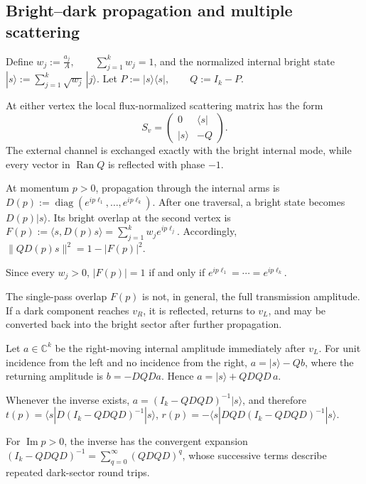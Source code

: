 \documentclass[11pt]{article}
\theoremstyle{plain}
\theoremstyle{definition}
\begin{document}
\subsection{Bright--dark propagation and multiple scattering}
\label{subsec:split-rejoin-bright-dark}
\label{subsec:split-rejoin-propagation}
\label{subsec:split-rejoin-multiple-scattering}

Define
\(w_j:=\frac{a_j}{A}, \qquad \sum_{j=1}^{k}w_j=1\),
and the normalized internal bright state
\(|s\rangle := \sum_{j=1}^{k}\sqrt{w_j}\,|j\rangle\).
Let
\(P:=|s\rangle\langle s|, \qquad Q:=I_k-P\).

At either vertex the local flux-normalized scattering matrix has the form
\[
  S_v
  =
  \begin{pmatrix}
    0 & \langle s|\\[1mm]
    |s\rangle & -Q
  \end{pmatrix}.
\]
The external channel is exchanged exactly with the bright internal
mode, while every vector in \(\operatorname{Ran}Q\) is reflected with phase \(-1\).

At momentum \(p>0\), propagation through the internal arms is
\(D(p) := \operatorname{diag} \left( e^{ip\ell_1}, \ldots, e^{ip\ell_k} \right)\).
After one traversal, a bright state becomes
\(D(p)|s\rangle\).
Its bright overlap at the second vertex is
\(F(p) := \langle s,D(p)s\rangle = \sum_{j=1}^{k}w_je^{ip\ell_j}\).
Accordingly,
\(\|QD(p)s\|^2 = 1-|F(p)|^2\).

Since every \(w_j>0\), \(|F(p)|=1\) if and only if
\(e^{ip\ell_1} = \cdots = e^{ip\ell_k}\).

The single-pass overlap \(F(p)\) is not, in general, the full transmission
amplitude. If a dark component reaches \(v_R\), it is reflected, returns to
\(v_L\), and may be converted back into the bright sector after further
propagation.

Let \(a\in\mathbb C^k\) be the right-moving internal amplitude immediately
after \(v_L\). For unit incidence from the left and no incidence from the
right,
\(a = |s\rangle-Qb\),
where the returning amplitude is
\(b=-DQDa\).
Hence
\(a = |s\rangle+QDQD\,a\).

Whenever the inverse exists,
\(a = (I_k-QDQD)^{-1}|s\rangle\),
and therefore
\(t(p) = \langle s| D(I_k-QDQD)^{-1} |s\rangle\),
\(r(p) = - \langle s| DQD(I_k-QDQD)^{-1} |s\rangle\).

For \(\operatorname{Im}p>0\), the inverse has the convergent expansion
\((I_k-QDQD)^{-1} = \sum_{q=0}^{\infty}(QDQD)^q\),
whose successive terms describe repeated dark-sector round trips.
\end{document}
